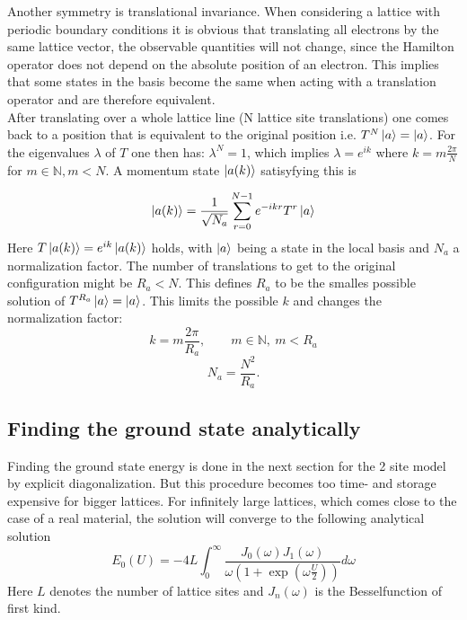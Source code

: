Another symmetry is translational invariance. When considering a lattice with periodic boundary conditions it is obvious that translating all electrons by the same lattice vector, the observable quantities will not change, since the Hamilton operator does not depend on the absolute position of an electron. This implies that some states in the basis become the same when acting with a translation operator and are therefore equivalent.\\
After translating over a whole lattice line  (N lattice site translations) one comes back to a position that is equivalent to the original position i.e. $ T^N\ket{a} = \ket{a} $. For the eigenvalues $\lambda$ of $T$ one then has:  $ \lambda^N = 1 $, which implies $ \lambda = e^{ik} $ where $ k = m\frac{2\pi}{N} $ for $ m \in \mathbb{N}, m < N $. A momentum state $ \ket{a(k)} $ satisyfying this is 

\begin{equation}\label{momentumstate}
\ket{a(k)} = \frac{1}{\sqrt{N_a}}\sum_{r=0}^{N-1}e^{-ikr}T^r\ket{a}
\end{equation}
Here $ T\ket{a(k)} = e^{ik}\ket{a(k)}$ holds, with $ \ket{a} $ being a state in the local basis and $ N_a $ a normalization factor. The number of translations to get to the original configuration might be $R_a < N$. This defines $R_a$ to be the smalles possible solution of  $ T^{R_a}\ket{a} = \ket{a} $. This limits the possible $k$ and changes the normalization factor:
\begin{equation}\label{k}
k = m\frac{2\pi}{R_a},\qquad m \in \mathbb{N},\: m < R_a
\end{equation}
\begin{equation}\label{N_a}
N_a = \frac{N^2}{R_a}.
\end{equation}



\subsection{Finding the ground state analytically}
Finding the ground state energy is done in the next section for the 2 site model by explicit diagonalization. But this procedure becomes too time- and storage expensive for bigger lattices. For infinitely large lattices, which comes close to the case of a real material, the solution will converge to the following analytical solution
\begin{equation}\label{analytisch}
E_0(U)=-4L\int_{0}^{\infty}\frac{J_0(\omega)J_1(\omega)}{\omega\left( 1+\exp\left( \omega\frac{U}{2}\right) \right) }d\omega
\end{equation}\cite{lieb}
Here $ L $ denotes the number of lattice sites and $ J_n(\omega) $ is the Besselfunction of first kind.
\newline